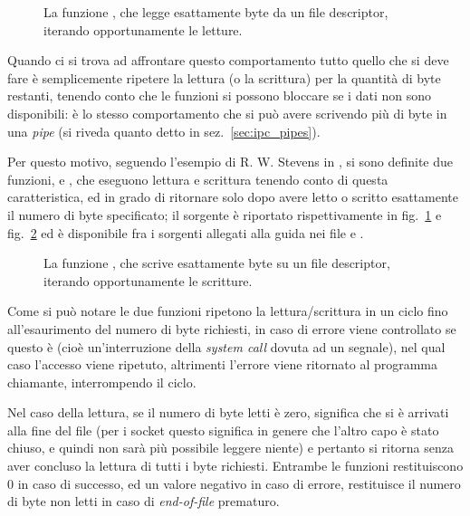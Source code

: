 \begin{figure}[!htbp]
  \footnotesize \centering
  \begin{minipage}[c]{\codesamplewidth}
  \end{minipage} 
  \normalsize
  \caption{La funzione , che legge esattamente  byte
    da un file descriptor, iterando opportunamente le letture.}
  \label{fig:sock_FullRead_code}
\end{figure}

Quando ci si trova ad affrontare questo comportamento tutto quello che si deve
fare è semplicemente ripetere la lettura (o la scrittura) per la quantità di
byte restanti, tenendo conto che le funzioni si possono bloccare se i dati non
sono disponibili: è lo stesso comportamento che si può avere scrivendo più di
 byte in una \textit{pipe} (si riveda quanto detto in
sez.~\ref{sec:ipc_pipes}).

Per questo motivo, seguendo l'esempio di R. W. Stevens in \cite{UNP1}, si sono
definite due funzioni,  e , che eseguono
lettura e scrittura tenendo conto di questa caratteristica, ed in grado di
ritornare solo dopo avere letto o scritto esattamente il numero di byte
specificato; il sorgente è riportato rispettivamente in
fig.~\ref{fig:sock_FullRead_code} e fig.~\ref{fig:sock_FullWrite_code} ed è
disponibile fra i sorgenti allegati alla guida nei file  e
.

\begin{figure}[!htbp]
  \centering
  \footnotesize \centering
  \begin{minipage}[c]{\codesamplewidth}
  \end{minipage} 
  \normalsize
  \caption{La funzione , che scrive esattamente 
    byte su un file descriptor, iterando opportunamente le scritture.}
  \label{fig:sock_FullWrite_code}
\end{figure}

Come si può notare le due funzioni ripetono la lettura/scrittura in un ciclo
fino all'esaurimento del numero di byte richiesti, in caso di errore viene
controllato se questo è  (cioè un'interruzione della
\textit{system call} dovuta ad un segnale), nel qual caso l'accesso viene
ripetuto, altrimenti l'errore viene ritornato al programma chiamante,
interrompendo il ciclo.

Nel caso della lettura, se il numero di byte letti è zero, significa che si è
arrivati alla fine del file (per i socket questo significa in genere che
l'altro capo è stato chiuso, e quindi non sarà più possibile leggere niente) e
pertanto si ritorna senza aver concluso la lettura di tutti i byte
richiesti. Entrambe le funzioni restituiscono 0 in caso di successo, ed un
valore negativo in caso di errore,  restituisce il numero di
byte non letti in caso di \textit{end-of-file} prematuro.


